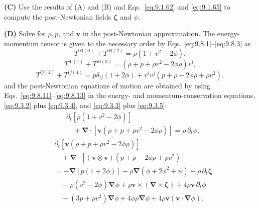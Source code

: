 \medskip
\noindent\textbf{(C)} Use the results of (A) and (B) and
Eqs.~\eqref{eq:9.1.62} and \eqref{eq:9.1.65} to compute the
post-Newtonian fields \(\boldsymbol\zeta\) and \(\psi\).

\medskip
\noindent\textbf{(D)} Solve for \(\rho,p\), and \(\mathbf v\) in the
post-Newtonian approximation. The energy-momentum tensor is given to the
necessary order by Eqs.~\eqref{eq:9.8.1}--\eqref{eq:9.8.3} as
\begin{equation}
  T^{00(0)}+T^{00(2)}
  =
  \rho(1+v^2-2\phi),
  \tag{9.8.11}\label{eq:9.8.11}
\end{equation}
\begin{equation}
  T^{i0(1)}+T^{i0(3)}
  =
  (\rho+p+\rho v^2-2\phi\rho)v^i,
  \tag{9.8.12}\label{eq:9.8.12}
\end{equation}
\begin{equation}
  T^{ij(2)}+T^{ij(4)}
  =
  p\delta_{ij}(1+2\phi)
  +v^iv^j(p+\rho-2\phi\rho+\rho v^2),
  \tag{9.8.13}\label{eq:9.8.13}
\end{equation}
and the post-Newtonian equations of motion are obtained by using
Eqs.~\eqref{eq:9.8.11}--\eqref{eq:9.8.13} in the energy- and
momentum-conservation equations, \eqref{eq:9.3.2} plus
\eqref{eq:9.3.4}, and \eqref{eq:9.3.3} plus \eqref{eq:9.3.5}:
\begin{equation}
  \begin{split}
  &\partial_t\!\left[\rho(1+v^2-2\phi)\right]\\
  &\quad
  +\boldsymbol\nabla\cdot
  \left[\mathbf v(\rho+p+\rho v^2-2\phi\rho)\right]
  =
  \rho\,\partial_t\phi,
  \end{split}
  \tag{9.8.14}\label{eq:9.8.14}
\end{equation}
\begin{equation}
  \begin{split}
  &\partial_t
  \left[\mathbf v(\rho+p+\rho v^2-2\phi\rho)\right]\\
  &\quad
  +\boldsymbol\nabla\cdot
  \left[
    (\mathbf v\otimes\mathbf v)
    (p+\rho-2\phi\rho+\rho v^2)
  \right]\\
  &=
  -\boldsymbol\nabla[p(1+2\phi)]
  -\rho\boldsymbol\nabla(\phi+2\phi^2+\psi)
  -\rho\,\partial_t\boldsymbol\zeta\\
  &\quad
  -\rho(v^2-2\phi)\boldsymbol\nabla\phi
  +\rho\mathbf v\times
   (\boldsymbol\nabla\times\boldsymbol\zeta)
  +4\rho\mathbf v\,\partial_t\phi\\
  &\quad
  -(3p+\rho v^2)\boldsymbol\nabla\phi
  +4\phi\rho\boldsymbol\nabla\phi
  +4\rho\mathbf v
   (\mathbf v\cdot\boldsymbol\nabla\phi).
  \end{split}
  \tag{9.8.15}\label{eq:9.8.15}
\end{equation}


